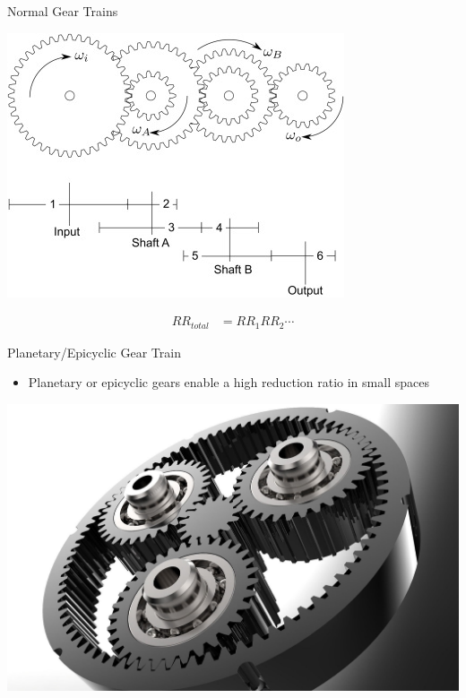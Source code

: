 \documentclass[10pt, svgnames]{beamer}
\begin{document}
\begin{frame}[label={sec:org69b6366}]{Normal Gear Trains}
\begin{center}
\includegraphics[width=.9\linewidth]{pictures/normal-gear-trains.jpg}
\end{center}

\begin{align*}
    RR_{total} &= RR_{1}RR_{2}\cdots
\end{align*}
\end{frame}

\begin{frame}[label={sec:org475f0bd}]{Planetary/Epicyclic Gear Train}
\begin{itemize}
\item Planetary or epicyclic gears enable a high reduction ratio in small
spaces
\end{itemize}

\begin{center}
\includegraphics[width=.9\linewidth]{pictures/planetary-gearbox.jpg}
\end{center}
\end{frame}
\end{document}
